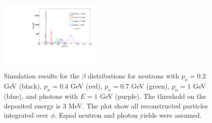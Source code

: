 \begin{figure}[htb]  
\begin{center}
\includegraphics[width=0.45\textwidth]{Figure/Figure42.pdf}
\caption {Simulation results for the $\beta$ distributions for neutrons with $p_n=0.2$ GeV (black), $p_n=0.4$ GeV (red), $p_n=0.7$ GeV (green), $p_n=1$ GeV (blue), and photons with $E=1$ GeV (purple). The threshold on the deposited energy is 3 MeV. The plot show all reconstructed particles integrated over $\phi$. Equal neutron and photon yields were assumed.}
\label{beta_n_g}
\end{center}
\end{figure}

